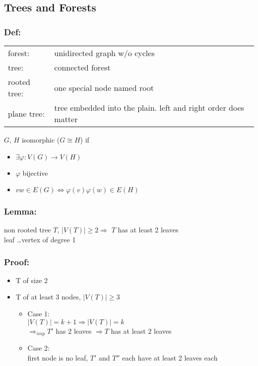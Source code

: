 \subsection{Trees and Forests}

\subsubsection*{Def:}
\begin{tabular}{l l}
forest:		& unidirected graph w/o cycles \\
tree:		& connected forest \\
rooted tree: 	& one special node named root \\
plane tree:	& tree embedded into the plain. left and right order does matter \\
\end{tabular}

$G$, $H$ isomorphic ($ G \cong H$) if 
\begin{itemize}
	\item $\exists \varphi : V(G) \rightarrow V(H)$
	\item $\varphi$ bijective 
	\item $vw \in E(G) \iff \varphi(v)\varphi(w) \in E(H)$
\end{itemize}

\subsubsection*{Lemma:}
non rooted tree $T$, $|V(T)| \geq 2 \Rightarrow$ $T$ has at least 2 leaves\\

leaf \ldots vertex of degree 1

\subsubsection*{Proof:}
\begin{itemize}
	\item T of size 2
	\item T of at least 3 nodes, $|V(T)| \geq 3$
	\begin{itemize}
		\item Case 1:\\
			$|V(T)| = k+1 \Rightarrow |V(T)| = k$ \\
			$\Rightarrow_{imp} T'$ has 2 leaves $\Rightarrow T$ has at least 2 leaves
		\item Case 2: \\
			first node is no leaf, $T'$ and $T''$ each have at least 2 leaves each

	\end{itemize}
\end{itemize}


